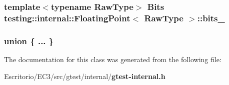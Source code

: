 \subsubsection{\setlength{\rightskip}{0pt plus 5cm}template$<$typename RawType$>$ {\bf Bits} {\bf testing::internal::FloatingPoint}$<$ RawType $>$::{\bf bits\_\-}}\label{classtesting_1_1internal_1_1FloatingPoint_0447c6c2bdd9eaf07b79f8a3c1702f2b}


\subsubsection{\setlength{\rightskip}{0pt plus 5cm}union \{ ... \} \hspace{0.3cm}{\tt  [private]}}\label{classtesting_1_1internal_1_1FloatingPoint_22de72d98893704afa622af964ca34a9}




The documentation for this class was generated from the following file:\begin{CompactItemize}
\item 
Escritorio/EC3/src/gtest/internal/{\bf gtest-internal.h}\end{CompactItemize}
